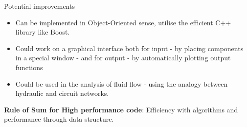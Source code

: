 \documentclass[xcolor=dvipsnames]{beamer}
\begin{document}
\begin{frame}{ Potential improvements}
	\begin{itemize}
		\item Can be implemented in Object-Oriented sense, utilise the efficient C++ library like Boost.
		\item Could work on a graphical interface both for input - by placing components in a special window - and for output - by automatically plotting output functions
		\item Could be used in the analysis of fluid flow - using the analogy between hydraulic and circuit networks.
	\end{itemize}
\textbf{Rule of Sum for High performance code}: Efficiency with algorithms and performance through data structure.
\end{frame}

%



\end{document}
